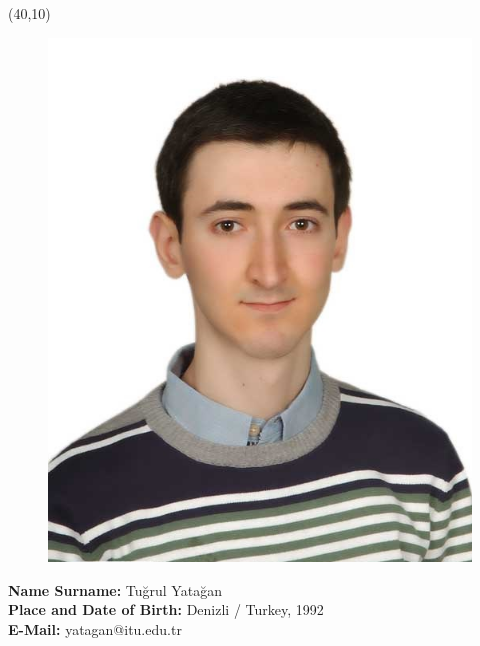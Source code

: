 \vspace{10mm}

\newsavebox{\mysquare}
\savebox{\mysquare}{\textcolor{black}{\rule[2.3pt]{3.4pt}{3.4pt}}}

\setlength{\TPHorizModule}{10pt}
\setlength{\TPVertModule}{10pt}
\begin{textblock}{1}(40,10)
 \begin{figure}[p]
 \includegraphics[scale=0.75,keepaspectratio=true]{./fig/cv_photo}
\end{figure}

\end{textblock}
\textbf{Name Surname:} Tu\u{g}rul Yata\u{g}an\\

\vspace{-3mm}
\textbf{Place and Date of Birth:} Denizli / Turkey, 1992\\

\vspace{-3mm}
\textbf{E-Mail:} yatagan@itu.edu.tr\\


